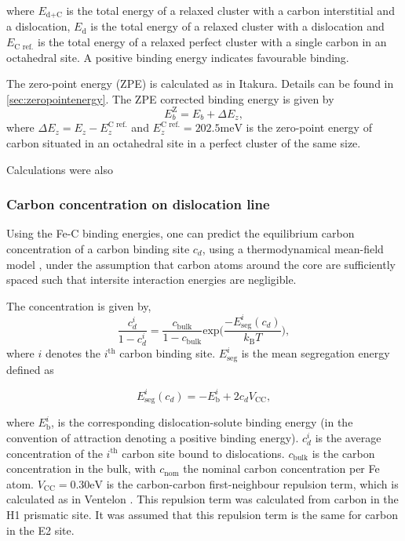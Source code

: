 \documentclass[a4paper,11pt]{article}
\numberwithin{equation}{chapter}
\numberwithin{listing}{chapter}
\begin{document}
where \(E_{\text{d+C}}\) is the total energy of a relaxed cluster with a
carbon interstitial and a dislocation, \(E_{\text{d}}\) is the total
energy of a relaxed cluster with a dislocation and \(E_{\text{C
    ref.}}\) is the total energy of a relaxed perfect cluster with a single carbon in
an octahedral site. A positive binding energy indicates favourable binding.

The zero-point energy (ZPE) is calculated as in Itakura. Details can be found in \ref{sec:zeropointenergy}.
The ZPE corrected binding energy is given by
\[ E^{\text{Z}}_{b} = E_b + \Delta E_z,  \]
where \(\Delta E_z = E_z - E_{z}^{\text{C ref.}}\) and \(E_{z}^{\text{C ref.}} = 202.5 \text{meV}\) is the zero-point energy of carbon
situated in an octahedral site in a perfect cluster of the same size.

Calculations were also
\subsubsection{Carbon concentration on dislocation line}
\label{sec:org0a55f9b}
\label{sec:carbon_concentration}

Using the Fe-C binding energies, one can predict the equilibrium carbon
concentration of a carbon binding site \(c_d\), using a thermodynamical mean-field model \cite{Treglia1999,Ventelon2015,mclean1957grain}, under the
assumption that carbon atoms around the core are sufficiently spaced such
that intersite interaction energies are negligible.

The concentration is given by,
\begin{equation}
\frac{ c_d^{i} }{1 -  c_d^{i} } = \frac{ c_{\text{bulk}} }{1 - c_{\text{bulk}} } \text{exp} \Big(
\frac{-E_{\text{seg}}^i(c_d)}{k_{\text{B}}T}  \Big),    \label{eq:cd}
\end{equation}
where \(i\) denotes the \(i^{\text{th}}\) carbon binding site.
\(E_{\text{seg}}^i\) is the mean segregation energy defined as

\[ E_{\text{seg}}^i(c_d) = -E_{\text{b}}^{i} + 2c_d
    V_{\text{CC}},\]

where \(E_{\text{b}}^{i}\), is the corresponding dislocation-solute binding
energy (in the convention of attraction denoting a positive binding
energy). \(c_d^{i}\) is the average concentration of the \(i^{\text{th}}\)
carbon site bound to dislocations. \(c_{\text{bulk}}\) is the carbon
concentration in the bulk, with \(c_{\text{nom}}\) the nominal carbon
concentration per Fe atom. \(V_{\text{CC}} = 0.30 \text{eV}\) is the carbon-carbon
first-neighbour repulsion term, which is calculated as in Ventelon
\cite{Ventelon2015}. This repulsion term was calculated from carbon in the H1
prismatic site. It was assumed that this repulsion term is the same for
carbon in the E2 site.
\end{document}
